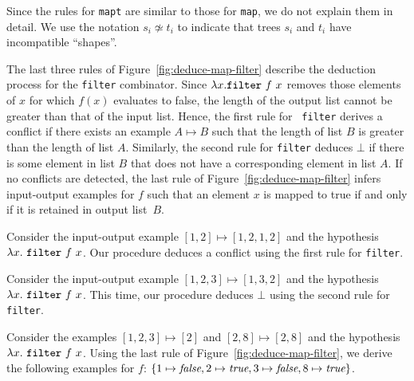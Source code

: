 Since the rules for {\tt mapt} are  similar to those for {\tt map},
 we do not explain them in detail. We use the notation $s_i \not \simeq t_i$ to indicate that trees $s_i$
and $t_i$ have incompatible ``shapes''.


The last three rules of Figure~\ref{fig:deduce-map-filter} describe
the deduction process for the {\tt filter} combinator. Since $\lambda
x. {\tt filter} \ f \ x$ removes those elements of $x$ for which
$f(x)$ evaluates to false, the length of the output list cannot be
greater than that of the input list. Hence, the first rule for {\tt
  filter} derives a conflict if there exists an example $A \mapsto B$
such that the length of list $B$ is greater than the length of list
$A$.  Similarly, the second rule for {\tt filter} deduces $\bot$ if
there is some element in list $B$ that does not have a corresponding
element in list $A$.  If no conflicts are detected, the last rule of
Figure~\ref{fig:deduce-map-filter} infers input-output examples for
$f$ such that an element $x$ is mapped to true if and only if it is
retained in output list~$B$.

\begin{example}
  Consider the input-output example $[1, 2] \mapsto [1, 2, 1, 2]$ and
  the hypothesis $\lambda x. \ {\tt filter} \ f \ x$. Our procedure
  deduces a conflict using the first rule for {\tt filter}.
\end{example}

\begin{example}
  Consider the input-output example $[1, 2, 3] \mapsto [1, 3, 2]$ and
  the hypothesis $\lambda x. \ {\tt filter} \ f \ x$. This time, our
  procedure deduces $\bot$ using the second rule for {\tt filter}.
\end{example}

\begin{example}
  Consider the examples $[1, 2, 3] \mapsto [2]$ and $[2,
  8] \mapsto [2, 8]$ and the hypothesis $\lambda x. \ {\tt filter} \ f
  \ x$. Using the last rule of Figure~\ref{fig:deduce-map-filter}, we
  derive the following examples for $f$: $\{ 1\mapsto \emph{false}, 2
  \mapsto \emph{true}, 3 \mapsto \emph{false}, 8 \mapsto \emph{true} \}$.
\end{example}

